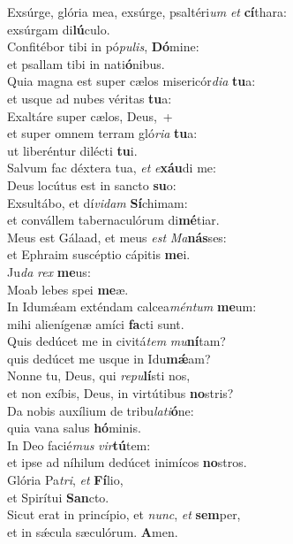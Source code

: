 \evenverse Exsúrge, glória mea, exsúrge, psaltéri\textit{um} \textit{et} \textbf{cí}thara:~\*\\
\evenverse exsúrgam di\textbf{lú}culo.\\
\oddverse Confitébor tibi in pó\textit{pu}\textit{lis}, \textbf{Dó}mine:~\*\\
\oddverse et psallam tibi in nati\textbf{ó}nibus.\\
\evenverse Quia magna est super cælos misericór\textit{di}\textit{a} \textbf{tu}a:~\*\\
\evenverse et usque ad nubes véritas \textbf{tu}a:\\
\oddverse Exaltáre super cælos, Deus,~+\\
\oddverse  et super omnem terram gló\textit{ri}\textit{a} \textbf{tu}a:~\*\\
\oddverse ut liberéntur dilécti \textbf{tu}i.\\
\evenverse Salvum fac déxtera tua, \textit{et} \textit{e}\textbf{xáu}di me:~\*\\
\evenverse Deus locútus est in sancto \textbf{su}o:\\
\oddverse Exsultábo, et dí\textit{vi}\textit{dam} \textbf{Sí}chimam:~\*\\
\oddverse et convállem tabernaculórum di\textbf{mé}tiar.\\
\evenverse Meus est Gálaad, et meus \textit{est} \textit{Ma}\textbf{nás}ses:~\*\\
\evenverse et Ephraim suscéptio cápitis \textbf{me}i.\\
\oddverse Ju\textit{da} \textit{rex} \textbf{me}us:~\*\\
\oddverse Moab lebes spei \textbf{me}æ.\\
\evenverse In Idumǽam exténdam calcea\textit{mén}\textit{tum} \textbf{me}um:~\*\\
\evenverse mihi alienígenæ amíci \textbf{fa}cti sunt.\\
\oddverse Quis dedúcet me in civitá\textit{tem} \textit{mu}\textbf{ní}tam?~\*\\
\oddverse quis dedúcet me usque in Idu\textbf{mǽ}am?\\
\evenverse Nonne tu, Deus, qui \textit{re}\textit{pu}\textbf{lí}sti nos,~\*\\
\evenverse et non exíbis, Deus, in virtútibus \textbf{no}stris?\\
\oddverse Da nobis auxílium de tribu\textit{la}\textit{ti}\textbf{ó}ne:~\*\\
\oddverse quia vana salus \textbf{hó}minis.\\
\evenverse In Deo facié\textit{mus} \textit{vir}\textbf{tú}tem:~\*\\
\evenverse et ipse ad níhilum dedúcet inimícos \textbf{no}stros.\\
\oddverse Glória Pa\textit{tri}, \textit{et} \textbf{Fí}lio,~\*\\
\oddverse et Spirítui \textbf{San}cto.\\
\evenverse Sicut erat in princípio, et \textit{nunc}, \textit{et} \textbf{sem}per,~\*\\
\evenverse et in sǽcula sæculórum. \textbf{A}men.\\
